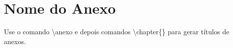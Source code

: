 \documentclass[openright]{normas-utf-tex} %
\begin{document}


\apendice



\anexo
\chapter{Nome do Anexo}

Use o comando {\ttfamily \textbackslash anexo} e depois comandos {\ttfamily \textbackslash chapter\{\}}
para gerar t\'itulos de anexos.








% 
%
\end{document}

